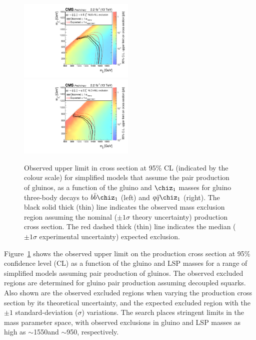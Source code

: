 \begin{figure}[thp!]
  \begin{center}
    \includegraphics[width=0.49\textwidth]{t1bbbbRA1XSEC.pdf} \,
    \includegraphics[width=0.49\textwidth]{t1qqqqRA1XSEC.pdf} \\
    \caption{Observed upper limit in cross section at 95\% CL
      (indicated by the colour scale) for simplified models that
      assume the pair production of gluinos, as a function of the
      gluino and $\chiz_{1}$ masses for gluino three-body decays to
      $b\bar{b}\chiz_{1}$ (left) and $q\bar{q}\chiz_{1}$ (right). The
      black solid thick (thin) line indicates the observed mass
      exclusion region assuming the nominal (${\pm}1 \sigma$ theory
      uncertainty) production cross section. The red dashed thick
      (thin) line indicates the median (${\pm}1 \sigma$ experimental
      uncertainty) expected exclusion.
      \label{fig:limits-sms} }
  \end{center}
\end{figure}

Figure~\ref{fig:limits-sms} shows the observed upper limit on the
production cross section at 95\% confidence level (CL) as a function
of the gluino and LSP masses for a range of simplified models assuming
pair production of gluinos. The observed excluded regions are
determined for gluino pair production assuming decoupled squarks. Also
shown are the observed excluded regions when varying the production
cross section by its theoretical uncertainty, and the expected
excluded region with the ${\pm}1$ standard-deviation ($\sigma$)
variations. The search places stringent limits in the mass parameter
space, with observed exclusions in gluino and LSP masses as high as
$\sim$1550\gev and $\sim$950\gev, respectively.

